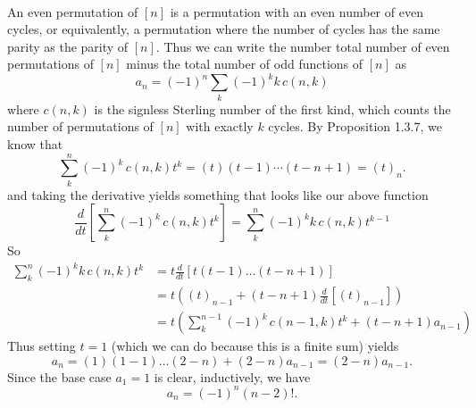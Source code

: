 \documentclass{article}
\newenvironment{solution}[1][Solution.]{\begin{trivlist}
\item[\hskip \labelsep {\bfseries #1}]}{\end{trivlist}}
\begin{document}
\begin{solution} \text{} \\
  An even permutation of $[n]$ is a permutation with an even number of even
  cycles, or equivalently, a permutation where the number of cycles has the same
  parity as the parity of $[n]$.
  Thus we can write the number total number of even permutations of $[n]$ minus
  the total number of odd functions of $[n]$ as \[
     a_n
     = (-1)^n\sum_k (-1)^k k\,c(n, k)
  \] where $c(n, k)$ is the signless Sterling number of the first kind, which
  counts the number of permutations of $[n]$ with exactly $k$ cycles.
  By Proposition 1.3.7, we know that \[
    \sum_k^n (-1)^k \,c(n, k) t^k = (t)(t - 1)\cdots(t - n + 1) = (t)_n.
  \] and taking the derivative yields something that looks like our above
  function \[
    \frac{d}{dt}\left[\sum_k^n (-1)^k \,c(n, k) t^k\right]
    = \sum_k^n (-1)^k k\,c(n, k) t^{k-1}
  \] So \begin{align*}
    \sum_k^n (-1)^k k\,c(n, k) t^k
    &= t\frac{d}{dt}[t(t-1) \hdots (t-n+1)] \\
    &= t\left((t)_{n - 1} + (t-n+1)\frac{d}{dt}\left[(t)_{n - 1}\right]\right) \\
    &= t\left(
      \sum_k^{n-1} (-1)^k \,c(n-1, k) t^k +
      (t-n+1)a_{n-1}
    \right)
  \end{align*}
  Thus setting $t = 1$ (which we can do because this is a finite sum) yields \[
    a_n = (1)(1 - 1)\hdots(2-n) + (2-n)a_{n-1} = (2-n)a_{n - 1}.
  \]
  Since the base case $a_{1} = 1$ is clear, inductively, we have \[
    a_n = (-1)^n(n - 2)!.
  \]
\end{solution}
\end{document}
